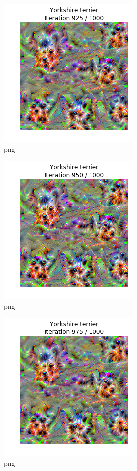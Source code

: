 \documentclass[]{book}
\theoremstyle{definition}
\theoremstyle{definition}
\theoremstyle{definition}
\theoremstyle{remark}
\begin{document}
\begin{figure}
\centering
\includegraphics{Network-Visualization-TensorFlow_files/Network-Visualization-TensorFlow_24_38.png}
\caption{png}
\end{figure}

\begin{figure}
\centering
\includegraphics{Network-Visualization-TensorFlow_files/Network-Visualization-TensorFlow_24_39.png}
\caption{png}
\end{figure}

\begin{figure}
\centering
\includegraphics{Network-Visualization-TensorFlow_files/Network-Visualization-TensorFlow_24_40.png}
\caption{png}
\end{figure}
\end{document}
